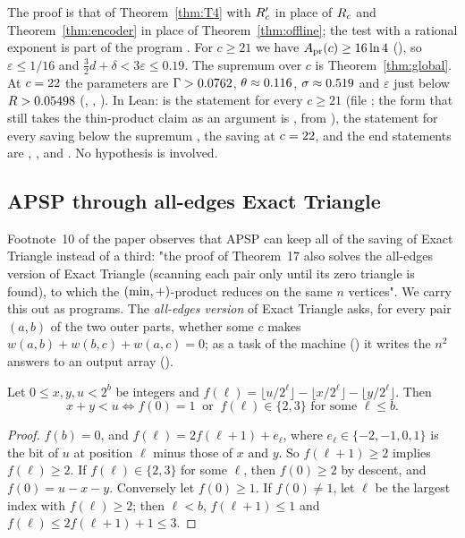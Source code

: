The proof is that of Theorem~\ref{thm:T4} with \(R'_{c}\) in place of \(R_{c}\) and
Theorem~\ref{thm:encoder} in place of Theorem~\ref{thm:offline}; the test with
a rational exponent is part of the program .  For \(c\ge21\) we
have \(A_{\mathrm{pr}}(c)\ge16\ln4\) (), so \(\varepsilon\le1/16\)
and \(\frac32d+\delta<3\varepsilon\le0.19\).  The supremum over \(c\) is
Theorem~\ref{thm:global}.  At \(c=22\) the parameters are
\(\Gamma>0.0762\), \(\theta\approx0.116\), \(\sigma\approx0.519\) and
\(\varepsilon\) just below \(R>0.05498\) (,
, ).  In Lean:
 is the statement for every \(c\ge21\) (file
; the form that still takes the thin-product
claim as an argument is , from
),  the
statement for every saving below the supremum ,
 the saving at \(c=22\), and the end statements
are , , 
and .  No hypothesis is involved.

\subsection{APSP through all-edges Exact Triangle}
\label{sec:alledges}

Footnote~10 of the paper observes that APSP can keep all of the saving of Exact
Triangle instead of a third: "the proof of Theorem~17 also solves the
all-edges version of Exact Triangle (scanning each pair only until its zero
triangle is found), to which the \((\min,+)\)-product reduces on the same \(n\)
vertices".  We carry this out as programs.  The \emph{all-edges version} of
Exact Triangle asks, for every pair \((a,b)\) of the two outer parts, whether
some \(c\) makes \(w(a,b)+w(b,c)+w(a,c)=0\); as a task of the machine
() it writes the \(n^{2}\) answers to an output array
().

\begin{lemma}\label{lem:F}
Let \(0\le x,y,u<2^{b}\) be integers and
\(f(\ell)=\lfloor u/2^{\ell}\rfloor-\lfloor x/2^{\ell}\rfloor-\lfloor y/2^{\ell}\rfloor\).
Then
\[
  x+y<u\iff f(0)=1\ \text{ or }\ f(\ell)\in\{2,3\}\text{ for some }\ell\le b .
\]
\end{lemma}

\begin{proof}
\(f(b)=0\), and \(f(\ell)=2f(\ell+1)+e_\ell\), where \(e_\ell\in\{-2,-1,0,1\}\)
is the bit of \(u\) at position \(\ell\) minus those of \(x\) and \(y\).  So
\(f(\ell+1)\ge2\) implies \(f(\ell)\ge2\).  If \(f(\ell)\in\{2,3\}\) for some
\(\ell\), then \(f(0)\ge2\) by descent, and \(f(0)=u-x-y\).  Conversely let
\(f(0)\ge1\).  If \(f(0)\ne1\), let \(\ell\) be the largest index with
\(f(\ell)\ge2\); then \(\ell<b\), \(f(\ell+1)\le1\) and
\(f(\ell)\le2f(\ell+1)+1\le3\).
\end{proof}

